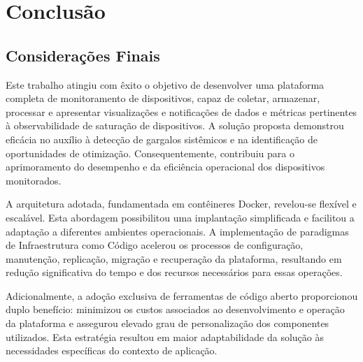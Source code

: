 \chapter{Conclusão}
\label{chap5}

\section{Considerações Finais}
\label{section:ConsideracoesFinais}

Este trabalho atingiu com êxito o objetivo de desenvolver uma plataforma completa de monitoramento de dispositivos, capaz de coletar, armazenar, processar e apresentar visualizações e notificações de dados e métricas pertinentes à observabilidade de saturação de dispositivos. A solução proposta demonstrou eficácia no auxílio à detecção de gargalos sistêmicos e na identificação de oportunidades de otimização. Consequentemente, contribuiu para o aprimoramento do desempenho e da eficiência operacional dos dispositivos monitorados.

A arquitetura adotada, fundamentada em contêineres Docker, revelou-se flexível e escalável. Esta abordagem possibilitou uma implantação simplificada e facilitou a adaptação a diferentes ambientes operacionais. A implementação de paradigmas de Infraestrutura como Código acelerou os processos de configuração, manutenção, replicação, migração e recuperação da plataforma, resultando em redução significativa do tempo e dos recursos necessários para essas operações.

Adicionalmente, a adoção exclusiva de ferramentas de código aberto proporcionou duplo benefício: minimizou os custos associados ao desenvolvimento e operação da plataforma e assegurou elevado grau de personalização dos componentes utilizados. Esta estratégia resultou em maior adaptabilidade da solução às necessidades específicas do contexto de aplicação.

